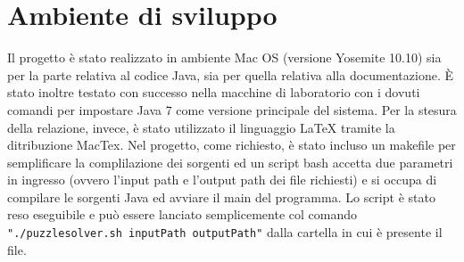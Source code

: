 %
%

\section{Ambiente di sviluppo}
Il progetto \`{e} stato realizzato in ambiente Mac OS (versione Yosemite 10.10) sia per la parte relativa al codice Java,
sia per quella relativa alla documentazione.
\`{E} stato inoltre testato con successo nella macchine di laboratorio con i dovuti comandi per impostare Java 7 come
versione principale del sistema.
Per la stesura della relazione, invece, \`{e} stato utilizzato il linguaggio \LaTeX{}  tramite la ditribuzione MacTex.
Nel progetto, come richiesto, \`{e} stato incluso un makefile per semplificare la complilazione dei sorgenti ed un script bash
accetta due parametri in ingresso (ovvero l'input path e l'output path dei file richiesti) e si occupa di compilare le sorgenti
Java ed avviare il main del programma. Lo script è stato reso eseguibile e può essere lanciato semplicemente col comando
 \texttt{"./puzzlesolver.sh inputPath outputPath"} dalla cartella in cui è presente il file.
